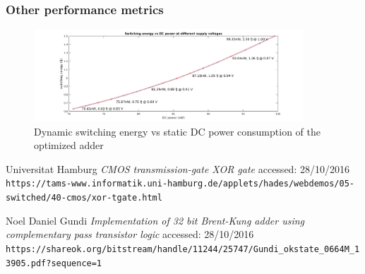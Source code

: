 \documentclass[english]{article}
\begin{document}
\subsubsection{Other performance metrics}
\begin{figure}[H]
\begin{centering}
\includegraphics[width=0.9\textwidth]{figures/dynamicStaticEnergy.png}
\par\end{centering}
\caption{Dynamic switching energy vs static DC power consumption of the optimized adder}
\label{adderEDP}
\end{figure}

\medskip

\begin{thebibliography}{9}

Universitat Hamburg
\textit{CMOS transmission-gate XOR gate}
accessed: 28/10/2016
\\\texttt{https://tams-www.informatik.uni-hamburg.de/applets/hades/webdemos/05-switched/40-cmos/xor-tgate.html}

Noel Daniel Gundi
\textit{Implementation of 32 bit Brent-Kung adder using complementary pass transistor logic}
accessed: 28/10/2016
\\\texttt{https://shareok.org/bitstream/handle/11244/25747/Gundi\_okstate\_0664M\_13905.pdf?sequence=1}

\end{thebibliography}
 
\end{document}
